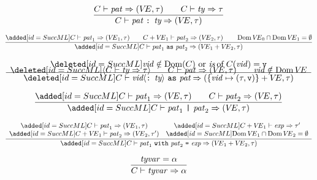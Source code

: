 \begin{equation}        %
\frac{\C\ts\pat\ra(\VE,\tau)\qquad\C\ts\ty\ra\tau}
     {\C\ts\typedpat\ra (\VE,\tau)}
\end{equation}

\begin{equation}        %
\label{layeredpat-rule}
\frac{\ADD{\C\ts\pat_1\ra(\VE_1,\tau) \qquad \plusmap{\C}{\VE_1}\ts\pat_2\ra(\VE_2,\tau) \qquad
      \Dom\VE_0\cap\Dom\VE_1 = \emptyset}}
     {\ADD{\C\ts\aspat\ra(\plusmap{\VE_1}{\VE_2},\tau)}}
\end{equation}

\SameEqn
\begin{equation}        %
\frac{\begin{array}{c}
     \CUT{\hbox{$\vid\notin\Dom(\C)$ or $\of{\is}{C(\vid)} = \isv$}}\\[-0.5em]
      \CUT{\langle\C\ts\ty\ra\tau\rangle\qquad
      \C\ts\pat\ra(\VE,\tau)\qquad \vid\notin\Dom\VE}\\[-0.5em]
      \end{array}
     }
     {\CUT{\C\ts\layeredvidpat\ra(\plusmap{\{\vid\mapsto(\tau,\isv)\}}{\VE},\tau)}}
\end{equation}%
\NextEqn

\BeginNewEqns
\begin{equation}        %
\label{orpat-rule}
\frac{\ADD{\C\ts\pat_1\ra(\VE,\tau) \qquad \C\ts\pat_2\ra(\VE,\tau)}}
     {\ADD{\C\ts\orpat\ra(\VE,\tau)}}
\end{equation}

\begin{equation}        %
\label{nestedmatch-rule}
\frac{\begin{array}{cc}
        \ADD{\C\ts\pat_1\ra(\VE_1,\tau)} & \ADD{\plusmap{\C}{\VE_1}\ts\exp\ra\tau'} \\
        \ADD{\plusmap{\C}{\VE_1}\ts\pat_2\ra(\VE_2,\tau')} & \ADD{\Dom\VE_1\cap\Dom\VE_2=\emptyset} \\
      \end{array}}
     {\ADD{\C\ts\nestedpat\ra(\plusmap{\VE_1}{\VE_2},\tau)}}
\end{equation}

\EndNewEqns

\begin{equation}        %
\frac{\tyvar=\alpha}
     {\C\ts\tyvar\ra\alpha}\index{32.1}
\end{equation}

